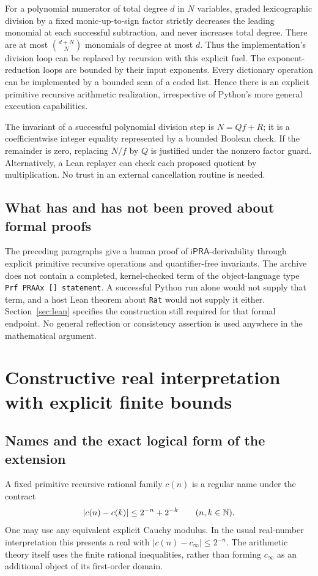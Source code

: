 \documentclass[11pt,a4paper]{article}
\numberwithin{equation}{section}
\theoremstyle{definition}\newtheorem{definition}[theorem]{Definition}
\theoremstyle{remark}\newtheorem{remark}[theorem]{Remark}
\newcommand{\ipra}{\mathsf{iPRA}}
\begin{document}
For a polynomial numerator of total degree $d$ in $N$ variables, graded lexicographic division by a fixed monic-up-to-sign factor strictly decreases the leading monomial at each successful subtraction, and never increases total degree. There are at most $\binom{d+N}{N}$ monomials of degree at most $d$. Thus the implementation's division loop can be replaced by recursion with this explicit fuel. The exponent-reduction loops are bounded by their input exponents. Every dictionary operation can be implemented by a bounded scan of a coded list. Hence there is an explicit primitive recursive arithmetic realization, irrespective of Python's more general execution capabilities.

The invariant of a successful polynomial division step is $N=Qf+R$; it is a coefficientwise integer equality represented by a bounded Boolean check. If the remainder is zero, replacing $N/f$ by $Q$ is justified under the nonzero factor guard. Alternatively, a Lean replayer can check each proposed quotient by multiplication. No trust in an external cancellation routine is needed.

\subsection{What has and has not been proved about formal proofs}
The preceding paragraphs give a human proof of $\ipra$-derivability through explicit primitive recursive operations and quantifier-free invariants. The archive does not contain a completed, kernel-checked term of the object-language type \texttt{Prf PRAAx [] statement}. A successful Python run alone would not supply that term, and a host Lean theorem about \texttt{Rat} would not supply it either. Section~\ref{sec:lean} specifies the construction still required for that formal endpoint. No general reflection or consistency assertion is used anywhere in the mathematical argument.

\section{Constructive real interpretation with explicit finite bounds}\label{sec:real}

\subsection{Names and the exact logical form of the extension}
A fixed primitive recursive rational family $c(n)$ is a regular name under the contract
\begin{equation}\label{eq:name}
 |c(n)-c(k)|\le 2^{-n}+2^{-k}\qquad(n,k\in\mathbb{N}).
\end{equation}
One may use any equivalent explicit Cauchy modulus. In the usual real-number interpretation this presents a real with $|c(n)-c_\infty|\le2^{-n}$. The arithmetic theory itself uses the finite rational inequalities, rather than forming $c_\infty$ as an additional object of its first-order domain.
\end{document}
